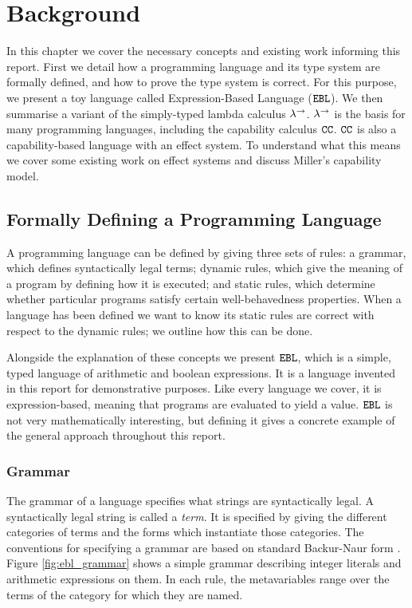 \chapter{Background}\label{C:background}

In this chapter we cover the necessary concepts and existing work informing this report. First we detail how a programming language and its type system are formally defined, and how to prove the type system is correct. For this purpose, we present a toy language called Expression-Based Language ($\mathtt{EBL}$). We then summarise a variant of the simply-typed lambda calculus $\lambda^{\rightarrow}$. $\lambda^{\rightarrow}$ is the basis for many programming languages, including the capability calculus $\mathtt{CC}$. $\mathtt{CC}$ is also a capability-based language with an effect system. To understand what this means we cover some existing work on effect systems and discuss Miller's capability model.

\section{Formally Defining a Programming Language}

A programming language can be defined by giving three sets of rules: a grammar, which defines syntactically legal terms; dynamic rules, which give the meaning of a program by defining how it is executed; and static rules, which determine whether particular programs satisfy certain well-behavedness properties. When a language has been defined we want to know its static rules are correct with respect to the dynamic rules; we outline how this can be done.

Alongside the explanation of these concepts we present $\mathtt{EBL}$, which is a simple, typed language of arithmetic and boolean expressions. It is a language invented in this report for demonstrative purposes. Like every language we cover, it is expression-based, meaning that programs are evaluated to yield a value. $\mathtt{EBL}$ is not very mathematically interesting, but defining it gives a concrete example of the general approach throughout this report.

\subsection{Grammar}

The grammar of a language specifies what strings are syntactically legal. A syntactically legal string is called a \textit{term}. It is specified by giving the different categories of terms and the forms which instantiate those categories. The conventions for specifying a grammar are based on standard Backur-Naur form \cite{bnf}. Figure \ref{fig:ebl_grammar} shows a simple grammar describing integer literals and arithmetic expressions on them. In each rule, the metavariables range over the terms of the category for which they are named.

